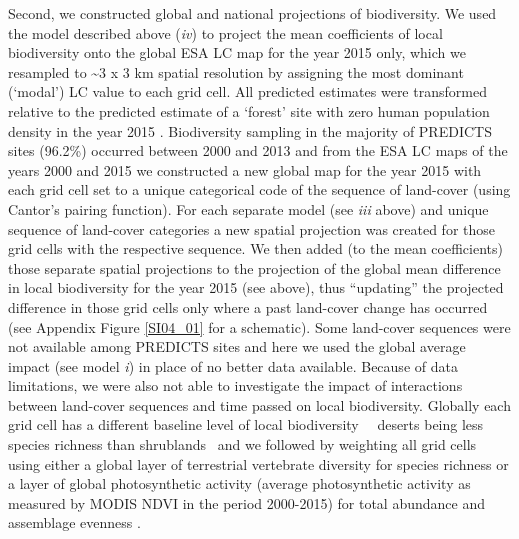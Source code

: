 Second, we constructed global and national projections of biodiversity. We used the model described above (\textit{iv}) to project the mean coefficients of local biodiversity onto the global ESA LC map for the year 2015 only, which we resampled to \textasciitilde3 x 3 km spatial resolution by assigning the most dominant (‘modal’) LC value to each grid cell. All predicted estimates were transformed relative to the predicted estimate of a ‘forest’ site with zero human population density in the year 2015 \citep{Newbold2015}. Biodiversity sampling in the majority of PREDICTS sites (96.2\%) occurred between 2000 and 2013 and from the ESA LC maps of the years 2000 and 2015 we constructed a new global map for the year 2015 with each grid cell set to a unique categorical code of the sequence of land-cover (using Cantor’s pairing function). For each separate model (see \textit{iii} above) and unique sequence of land-cover categories a new spatial projection was created for those grid cells with the respective sequence. We then added (to the mean coefficients) those separate spatial projections to the projection of the global mean difference in local biodiversity for the year 2015 (see above), thus “updating” the projected difference in those grid cells only where a past land-cover change has occurred (see Appendix Figure \ref{SI04_01} for a schematic). Some land-cover sequences were not available among PREDICTS sites and here we used the global average impact (see model \textit{i}) in place of no better data available. Because of data limitations, we were also not able to investigate the impact of interactions between land-cover sequences and time passed on local biodiversity. Globally each grid cell has a different baseline level of local biodiversity \textendash\ \eg\ deserts being less species richness than shrublands \textendash\ and we followed \cite{Newbold2015} by weighting all grid cells using either a global layer of terrestrial vertebrate diversity \citep[summed range-of-occurrence maps for bird, mammal and amphibian species,][]{NatureServe2012,IUCN2016a} for species richness or a layer of global photosynthetic activity (average photosynthetic activity as measured by MODIS NDVI in the period 2000-2015) for total abundance and assemblage evenness \citep{Newbold2015}. 

